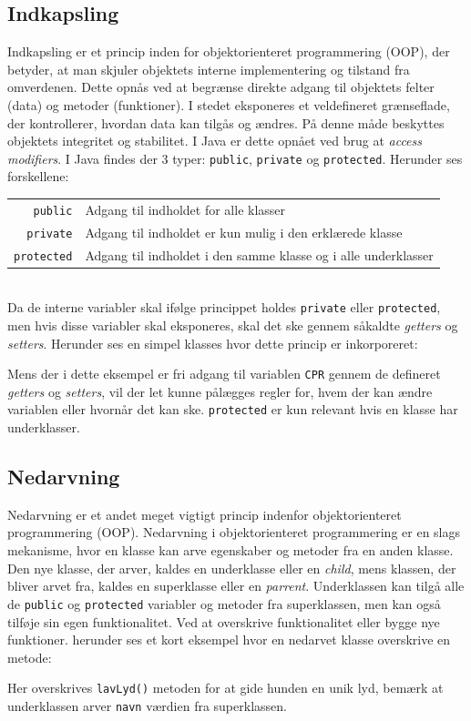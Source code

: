 \documentclass{article}
\begin{document}
\subsection{Indkapsling}
Indkapsling er et princip inden for objektorienteret programmering (OOP), der betyder, at man skjuler objektets interne implementering og tilstand fra omverdenen. Dette opnås ved at begrænse direkte adgang til objektets felter (data) og metoder (funktioner). I stedet eksponeres et veldefineret grænseflade, der kontrollerer, hvordan data kan tilgås og ændres. På denne måde beskyttes objektets integritet og stabilitet. \parencite{Scoutapm_2021} I Java er dette opnået ved brug at \textit{access modifiers}. I Java findes der 3 typer: \texttt{public}, \texttt{private} og \texttt{protected}. Herunder ses forskellene:
\begin{table}[!h]
    \centering
    \begin{tabular}{rl}
        \texttt{public} & Adgang til indholdet for alle klasser\\
        \texttt{private} & Adgang til indholdet er kun mulig i den erklærede klasse\\
        \texttt{protected} & Adgang til indholdet i den samme klasse og i alle underklasser\\
    \end{tabular}
    \label{tab:my_label}
\end{table}\\
Da de interne variabler skal ifølge princippet holdes \texttt{private} eller \texttt{protected}, men hvis disse variabler skal eksponeres, skal det ske gennem såkaldte \textit{getters} og \textit{setters}. Herunder ses en simpel klasses hvor dette princip er inkorporeret:

Mens der i dette eksempel er fri adgang til variablen \texttt{CPR} gennem de defineret \textit{getters} og \textit{setters}, vil der let kunne pålægges regler for, hvem der kan ændre variablen eller hvornår det kan ske. \texttt{protected} er kun relevant hvis en klasse har underklasser.
\newpage
\subsection{Nedarvning}
Nedarvning er et andet meget vigtigt princip indenfor objektorienteret programmering (OOP). Nedarvning i objektorienteret programmering er en slags mekanisme, hvor en klasse kan arve egenskaber og metoder fra en anden klasse. Den nye klasse, der arver, kaldes en underklasse eller en \textit{child}, mens klassen, der bliver arvet fra, kaldes en superklasse eller en \textit{parrent}. Underklassen kan tilgå alle de \texttt{public} og \texttt{protected} variabler og metoder fra superklassen, men kan også tilføje sin egen funktionalitet. Ved at overskrive funktionalitet eller bygge nye funktioner. herunder ses et kort eksempel hvor en nedarvet klasse overskrive en metode:

Her overskrives \texttt{lavLyd()} metoden for at gide hunden en unik lyd, bemærk at underklassen arver \texttt{navn} værdien fra superklassen.
\end{document}
